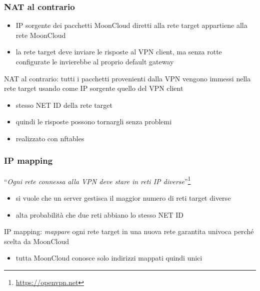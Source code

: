 \begin{frame}
	\frametitle{NAT al contrario}
		
	\begin{itemize}
		\item IP sorgente dei pacchetti MoonCloud diretti alla rete target
		      appartiene alla rete MoonCloud
		\item la rete target deve inviare le risposte al VPN client, ma senza
		      rotte configurate le invierebbe al proprio default gateway
	\end{itemize}
		
	\alert{NAT al contrario}: tutti i pacchetti provenienti dalla VPN vengono
	immessi nella rete target usando come IP sorgente quello del VPN client
	\begin{itemize}
		\item stesso NET ID della rete target
		\item quindi le risposte possono tornargli senza problemi
		\item realizzato con \alert{nftables}
	\end{itemize}
\end{frame}

\begin{frame}
	\frametitle{IP mapping}
	``\textit{Ogni rete connessa alla VPN deve stare in reti IP diverse}''\footnote{\url{https://openvpn.net}}
	\begin{itemize}
		\item si vuole che un server gestisca il maggior numero di reti target diverse
		\item alta probabilità che due reti abbiano lo stesso NET ID
	\end{itemize}
		
	\alert{IP mapping}: \textit{mappare} ogni rete target in una nuova rete
	\alert{garantita univoca} perché scelta da MoonCloud
	\begin{itemize}
		\item tutta MoonCloud conosce solo indirizzi mappati quindi unici
	\end{itemize}
\end{frame}


